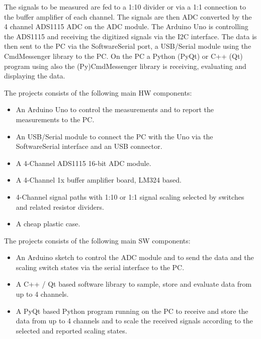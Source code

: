 \documentclass[11pt, oneside]{scrartcl}   	%
\begin{document}
The signals to be measured are fed to a 1:10 divider or via a 1:1 connection to the buffer amplifier of each channel.
The signals are then ADC converted by the 4 channel ADS1115 ADC on the ADC module.
The Arduino Uno is controlling the ADS1115 and receiving the digitized signals via the I2C interface.
The data is then sent to the PC via the SoftwareSerial port, a USB/Serial module using the CmdMessenger library to the PC.
On the PC a Python (PyQt) or C++ (Qt) program using also the (Py)CmdMessenger library is receiving, evaluating and displaying the data.

The projects consists of the following main HW components:
\begin{itemize}
	\item An Arduino Uno to control the measurements and to report the measurements to the PC.
	\item An USB/Serial module to connect the PC with the Uno via the SoftwareSerial interface and an USB connector.
	\item A 4-Channel ADS1115 16-bit ADC module.
	\item A 4-Channel 1x buffer amplifier board, LM324 based.
	\item 4-Channel signal paths with 1:10 or 1:1 signal scaling selected by switches and related resistor dividers. 
	\item A cheap plastic case.
\end{itemize}

The projects consists of the following main SW components:
\begin{itemize}
	\item An Arduino sketch to control the ADC module and to send the data and the scaling switch states via the serial interface to the PC.
	\item A C++ / Qt based software library to sample, store and evaluate data from up to 4 channels.
	\item A PyQt based Python program running on the PC to receive and store the data from up to 4 channels and to scale the received signals according to the selected and reported scaling states.
\end{itemize}

\newpage
\end{document}
